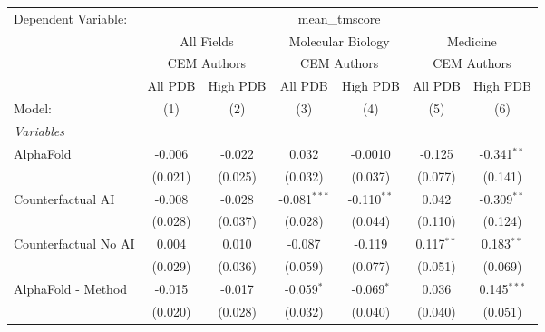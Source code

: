 \begingroup
\centering
\begin{tabular}{lcccccc}
   \tabularnewline \midrule \midrule
   Dependent Variable: & \multicolumn{6}{c}{mean\_tmscore}\\
 & \multicolumn{2}{c}{All Fields} & \multicolumn{2}{c}{Molecular Biology} & \multicolumn{2}{c}{Medicine} \\
\cmidrule(lr){2-3} \cmidrule(lr){4-5} \cmidrule(lr){6-7}
 & \multicolumn{2}{c}{CEM Authors} & \multicolumn{2}{c}{CEM Authors} & \multicolumn{2}{c}{CEM Authors} \\
\cmidrule(lr){2-3} \cmidrule(lr){4-5} \cmidrule(lr){6-7}
 & \multicolumn{1}{c}{All PDB} & \multicolumn{1}{c}{High PDB} & \multicolumn{1}{c}{All PDB} & \multicolumn{1}{c}{High PDB} & \multicolumn{1}{c}{All PDB} & \multicolumn{1}{c}{High PDB} \\
\cmidrule(lr){2-2} \cmidrule(lr){3-3} \cmidrule(lr){4-4} \cmidrule(lr){5-5} \cmidrule(lr){6-6} \cmidrule(lr){7-7}
   Model:                                                     & (1)     & (2)     & (3)            & (4)           & (5)          & (6)\\  
   \midrule
   \emph{Variables}\\
   AlphaFold                                                  & -0.006  & -0.022  & 0.032          & -0.0010       & -0.125       & -0.341$^{**}$\\   
                                                              & (0.021) & (0.025) & (0.032)        & (0.037)       & (0.077)      & (0.141)\\   
   Counterfactual AI                                          & -0.008  & -0.028  & -0.081$^{***}$ & -0.110$^{**}$ & 0.042        & -0.309$^{**}$\\   
                                                              & (0.028) & (0.037) & (0.028)        & (0.044)       & (0.110)      & (0.124)\\   
   Counterfactual No AI                                       & 0.004   & 0.010   & -0.087         & -0.119        & 0.117$^{**}$ & 0.183$^{**}$\\   
                                                              & (0.029) & (0.036) & (0.059)        & (0.077)       & (0.051)      & (0.069)\\   
   AlphaFold - Method                                         & -0.015  & -0.017  & -0.059$^{*}$   & -0.069$^{*}$  & 0.036        & 0.145$^{***}$\\   
                                                              & (0.020) & (0.028) & (0.032)        & (0.040)       & (0.040)      & (0.051)\\   

\end{tabular}
